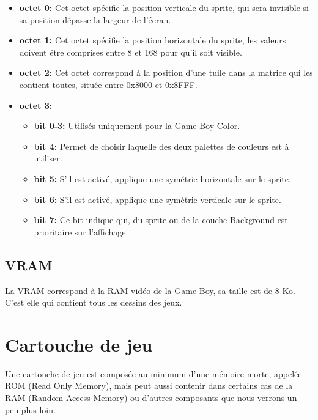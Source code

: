 \documentclass{report}
\begin{document}
\begin{itemize}
\item \textbf{octet 0:}
	Cet octet spécifie la position verticale du sprite, qui sera invisible si sa position dépasse la largeur de l'écran.\\
\item \textbf{octet 1:}
	Cet octet spécifie la position horizontale du sprite, les valeurs doivent être comprises entre 8 et 168 pour qu'il soit visible.\\
\item \textbf{octet 2:}
	Cet octet correspond à la position d'une tuile dans la matrice qui les contient toutes, située entre 0x8000 et 0x8FFF.\\
\item \textbf{octet 3:}
	\begin{itemize}
	\item \textbf{bit 0-3:}
		Utilisés uniquement pour la Game Boy Color.\\
	\item \textbf{bit 4:}
		Permet de choisir laquelle des deux palettes de couleurs est à utiliser.\\
	\item \textbf{bit 5:}
		S'il est activé, applique une symétrie horizontale sur le sprite.\\
	\item \textbf{bit 6:}
		S'il est activé, applique une symétrie verticale sur le sprite.\\
	\item \textbf{bit 7:}
		Ce bit indique qui, du sprite ou de la couche Background est prioritaire sur l'affichage. \\
	\end{itemize}
	
\end{itemize}

\subsection{VRAM}
La VRAM correspond à la RAM vidéo de la Game Boy, sa taille est de 8 Ko. C'est elle qui contient tous les dessins des jeux.

\section{Cartouche de jeu}
Une cartouche de jeu est composée au minimum d'une mémoire morte, appelée ROM (Read Only Memory), mais peut aussi contenir dans certains cas de la RAM (Random Access Memory) ou d'autres composants que nous verrons un peu plus loin.
\end{document}
